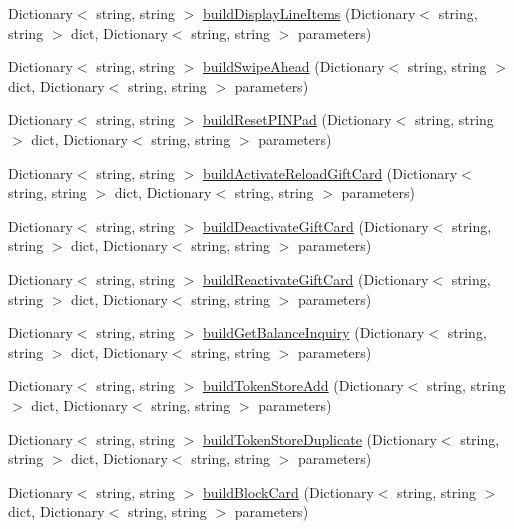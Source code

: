 \begin{DoxyCompactItemize}
\item 
Dictionary$<$ string, string $>$ \mbox{\hyperlink{class_form_sim_1_1_h_t_t_p_handler_a438c57cc6d6cc7afb0f73ec9771eaac8}{build\+Display\+Line\+Items}} (Dictionary$<$ string, string $>$ dict, Dictionary$<$ string, string $>$ parameters)
\item 
Dictionary$<$ string, string $>$ \mbox{\hyperlink{class_form_sim_1_1_h_t_t_p_handler_a11cc24e3e5d55dd5cece376b8eeafe6f}{build\+Swipe\+Ahead}} (Dictionary$<$ string, string $>$ dict, Dictionary$<$ string, string $>$ parameters)
\item 
Dictionary$<$ string, string $>$ \mbox{\hyperlink{class_form_sim_1_1_h_t_t_p_handler_a765f05cd55ea7dfd8b11e208451a80de}{build\+Reset\+P\+I\+N\+Pad}} (Dictionary$<$ string, string $>$ dict, Dictionary$<$ string, string $>$ parameters)
\item 
Dictionary$<$ string, string $>$ \mbox{\hyperlink{class_form_sim_1_1_h_t_t_p_handler_a5e51df91935179f2c7acfed9d783b6b4}{build\+Activate\+Reload\+Gift\+Card}} (Dictionary$<$ string, string $>$ dict, Dictionary$<$ string, string $>$ parameters)
\item 
Dictionary$<$ string, string $>$ \mbox{\hyperlink{class_form_sim_1_1_h_t_t_p_handler_a4bd3c7feb6f91dc88e657a619e7c263c}{build\+Deactivate\+Gift\+Card}} (Dictionary$<$ string, string $>$ dict, Dictionary$<$ string, string $>$ parameters)
\item 
Dictionary$<$ string, string $>$ \mbox{\hyperlink{class_form_sim_1_1_h_t_t_p_handler_af8e694086f55bb57f2819568b8a26eeb}{build\+Reactivate\+Gift\+Card}} (Dictionary$<$ string, string $>$ dict, Dictionary$<$ string, string $>$ parameters)
\item 
Dictionary$<$ string, string $>$ \mbox{\hyperlink{class_form_sim_1_1_h_t_t_p_handler_a956022ccfedfffe794e255be14d1121d}{build\+Get\+Balance\+Inquiry}} (Dictionary$<$ string, string $>$ dict, Dictionary$<$ string, string $>$ parameters)
\item 
Dictionary$<$ string, string $>$ \mbox{\hyperlink{class_form_sim_1_1_h_t_t_p_handler_ad44ba5b38c29b1ddd7fd87e35efa9157}{build\+Token\+Store\+Add}} (Dictionary$<$ string, string $>$ dict, Dictionary$<$ string, string $>$ parameters)
\item 
Dictionary$<$ string, string $>$ \mbox{\hyperlink{class_form_sim_1_1_h_t_t_p_handler_a12cf0f67fa1adf79e80ba68de9f06ab2}{build\+Token\+Store\+Duplicate}} (Dictionary$<$ string, string $>$ dict, Dictionary$<$ string, string $>$ parameters)
\item 
Dictionary$<$ string, string $>$ \mbox{\hyperlink{class_form_sim_1_1_h_t_t_p_handler_aa4d588b33663ae43ed124608bb0b2492}{build\+Block\+Card}} (Dictionary$<$ string, string $>$ dict, Dictionary$<$ string, string $>$ parameters)

\end{DoxyCompactItemize}
